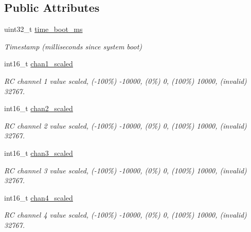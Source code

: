 \subsection*{Public Attributes}
\begin{DoxyCompactItemize}
\item 
\hypertarget{struct____mavlink__rc__channels__scaled__t_ae035a89efbc6107932416a1a65268bfe}{uint32\+\_\+t \hyperlink{struct____mavlink__rc__channels__scaled__t_ae035a89efbc6107932416a1a65268bfe}{time\+\_\+boot\+\_\+ms}}\label{struct____mavlink__rc__channels__scaled__t_ae035a89efbc6107932416a1a65268bfe}

\begin{DoxyCompactList}\small\item\em Timestamp (milliseconds since system boot) \end{DoxyCompactList}\item 
int16\+\_\+t \hyperlink{struct____mavlink__rc__channels__scaled__t_a2d350897e12b0008208e61a031f01270}{chan1\+\_\+scaled}
\begin{DoxyCompactList}\small\item\em R\+C channel 1 value scaled, (-\/100\%) -\/10000, (0\%) 0, (100\%) 10000, (invalid) 32767. \end{DoxyCompactList}\item 
int16\+\_\+t \hyperlink{struct____mavlink__rc__channels__scaled__t_a8ca88934095102f7195b4e5ab88ecd5c}{chan2\+\_\+scaled}
\begin{DoxyCompactList}\small\item\em R\+C channel 2 value scaled, (-\/100\%) -\/10000, (0\%) 0, (100\%) 10000, (invalid) 32767. \end{DoxyCompactList}\item 
int16\+\_\+t \hyperlink{struct____mavlink__rc__channels__scaled__t_a1f6f236dabbe2174233f2bf4e16f3c7d}{chan3\+\_\+scaled}
\begin{DoxyCompactList}\small\item\em R\+C channel 3 value scaled, (-\/100\%) -\/10000, (0\%) 0, (100\%) 10000, (invalid) 32767. \end{DoxyCompactList}\item 
int16\+\_\+t \hyperlink{struct____mavlink__rc__channels__scaled__t_a707b8ff01d82e1ddb4aa440c60265315}{chan4\+\_\+scaled}
\begin{DoxyCompactList}\small\item\em R\+C channel 4 value scaled, (-\/100\%) -\/10000, (0\%) 0, (100\%) 10000, (invalid) 32767. \end{DoxyCompactList}\item 

\end{DoxyCompactItemize}
